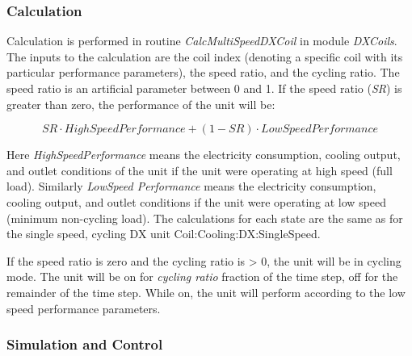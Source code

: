 \subsubsection{Calculation}\label{calculation-000}

Calculation is performed in routine \emph{CalcMultiSpeedDXCoil} in module \emph{DXCoils}. The inputs to the calculation are the coil index (denoting a specific coil with its particular performance parameters), the speed ratio, and the cycling ratio. The speed ratio is an artificial parameter between 0 and 1. If the speed ratio (\emph{SR}) is greater than zero, the performance of the unit will be:

\begin{equation}
SR\cdot HighSpeedPerformance + (1 - SR)\cdot LowSpeedPerformance
\end{equation}

Here \emph{HighSpeedPerformance} means the electricity consumption, cooling output, and outlet conditions of the unit if the unit were operating at high speed (full load). Similarly \emph{LowSpeed Performance} means the electricity consumption, cooling output, and outlet conditions if the unit were operating at low speed (minimum non-cycling load). The calculations for each state are the same as for the single speed, cycling DX unit Coil:Cooling:DX:SingleSpeed.

If the speed ratio is zero and the cycling ratio is \textgreater{} 0, the unit will be in cycling mode. The unit will be on for \emph{cycling ratio} fraction of the time step, off for the remainder of the time step. While on, the unit will perform according to the low speed performance parameters.

\subsubsection{Simulation and Control}\label{simulation-and-control-001}

